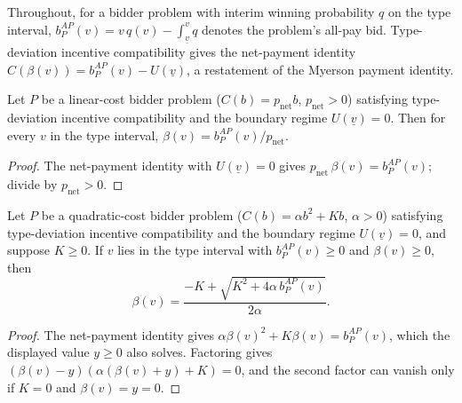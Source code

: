 Throughout, for a bidder problem with interim winning probability $q$ on the type interval, $b^{AP}_P(v) = v\,q(v) - \int_{\underline v}^v q$ denotes the problem's all-pay bid. Type-deviation incentive compatibility gives the net-payment identity $C(\beta(v)) = b^{AP}_P(v) - U(\underline v)$, a restatement of the Myerson payment identity.

\begin{theorem}\label{thm:MathEconLib.LinearCostProblem.constant_scarcity_strategy}
\leanok
{}
Let $P$ be a linear-cost bidder problem ($C(b) = p_{\mathrm{net}} b$, $p_{\mathrm{net}} > 0$) satisfying type-deviation incentive compatibility and the boundary regime $U(\underline v) = 0$. Then for every $v$ in the type interval, $\beta(v) = b^{AP}_P(v)/p_{\mathrm{net}}$.
\end{theorem}
\begin{proof}
\leanok
{}
The net-payment identity with $U(\underline v) = 0$ gives $p_{\mathrm{net}}\,\beta(v) = b^{AP}_P(v)$; divide by $p_{\mathrm{net}} > 0$.
\end{proof}

\begin{theorem}\label{thm:MathEconLib.QuadraticCostProblem.boundary_regime_strategy}
\leanok
{}
Let $P$ be a quadratic-cost bidder problem ($C(b) = \alpha b^2 + K b$, $\alpha > 0$) satisfying type-deviation incentive compatibility and the boundary regime $U(\underline v) = 0$, and suppose $K \ge 0$. If $v$ lies in the type interval with $b^{AP}_P(v) \ge 0$ and $\beta(v) \ge 0$, then
\[
  \beta(v) = \frac{-K + \sqrt{K^2 + 4\alpha\, b^{AP}_P(v)}}{2\alpha}.
\]
\end{theorem}
\begin{proof}
\leanok
{}
The net-payment identity gives $\alpha\beta(v)^2 + K\beta(v) = b^{AP}_P(v)$, which the displayed value $y \ge 0$ also solves. Factoring gives $(\beta(v) - y)(\alpha(\beta(v)+y) + K) = 0$, and the second factor can vanish only if $K = 0$ and $\beta(v) = y = 0$.
\end{proof}

